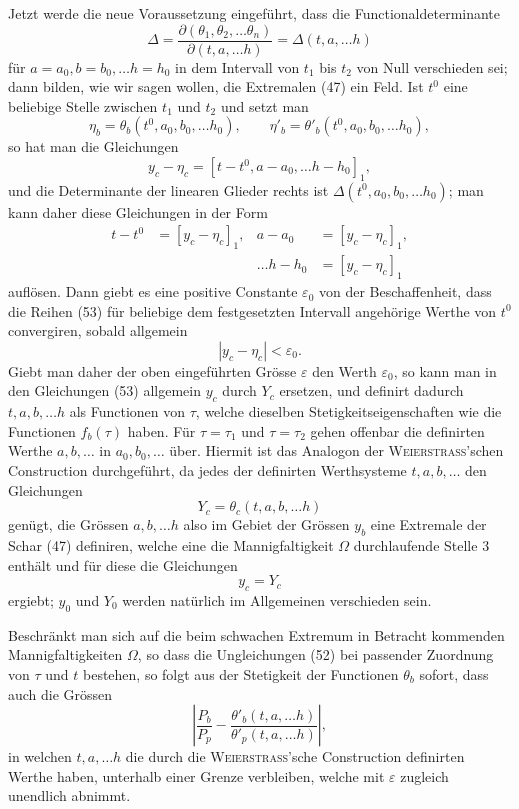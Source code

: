 \documentclass[11pt,a4paper,leqno]{article}
\begin{document}
Jetzt werde die neue Voraussetzung eingeführt, dass die Functionaldeterminante
\[
\Delta=
\frac{\partial(\theta_1,\theta_2,\ldots\theta_n)}
{\partial(t,a,\ldots h)}
=\Delta(t,a,\ldots h)
\]
für $a=a_0,b=b_0,\ldots h=h_0$ in dem Intervall von $t_1$ bis $t_2$ von Null verschieden sei; dann bilden, wie wir sagen wollen, die Extremalen (47) ein Feld. Ist $t^0$ eine beliebige Stelle zwischen $t_1$ und $t_2$ und setzt man
\[
\eta_b=\theta_b(t^0,a_0,b_0,\ldots h_0),
\qquad
\eta'_b=\theta'_b(t^0,a_0,b_0,\ldots h_0),
\]
so hat man die Gleichungen
\[
y_c-\eta_c=[t-t^0,a-a_0,\ldots h-h_0]_1,
\]
und die Determinante der linearen Glieder rechts ist $\Delta(t^0,a_0,b_0,\ldots h_0)$; man kann daher diese Gleichungen in der Form
\begin{equation}\tag{53}
\begin{aligned}
t-t^0&=[y_c-\eta_c]_1,
&a-a_0&=[y_c-\eta_c]_1,\\
&&\ldots h-h_0&=[y_c-\eta_c]_1
\end{aligned}
\end{equation}
auflösen. Dann giebt es eine positive Constante $\varepsilon_0$ von der Beschaffenheit, dass die Reihen (53) für beliebige dem festgesetzten Intervall angehörige Werthe von $t^0$ convergiren, sobald allgemein
\[
|y_c-\eta_c|<\varepsilon_0.
\]
Giebt man daher der oben eingeführten Grösse $\varepsilon$ den Werth $\varepsilon_0$, so kann man in den Gleichungen (53) allgemein $y_c$ durch $Y_c$ ersetzen, und definirt dadurch $t,a,b,\ldots h$ als Functionen von $\tau$, welche dieselben Stetigkeitseigenschaften wie die Functionen $f_b(\tau)$ haben. Für $\tau=\tau_1$ und $\tau=\tau_2$ gehen offenbar die definirten Werthe $a,b,\ldots$ in $a_0,b_0,\ldots$ über. Hiermit ist das Analogon der \textsc{Weierstrass}'schen Construction durchgeführt, da jedes der definirten Werthsysteme $t,a,b,\ldots$ den Gleichungen
\begin{equation}\tag{54}
Y_c=\theta_c(t,a,b,\ldots h)
\end{equation}
genügt, die Grössen $a,b,\ldots h$ also im Gebiet der Grössen $y_b$ eine Extremale der Schar (47) definiren, welche eine die Mannigfaltigkeit $\Omega$ durchlaufende Stelle 3 enthält und für diese die Gleichungen
\[
y_c=Y_c
\]
ergiebt; $y_0$ und $Y_0$ werden natürlich im Allgemeinen verschieden sein.

Beschränkt man sich auf die beim schwachen Extremum in Betracht kommenden Mannigfaltigkeiten $\Omega$, so dass die Ungleichungen (52) bei passender Zuordnung von $\tau$ und $t$ bestehen, so folgt aus der Stetigkeit der Functionen $\theta_b$ sofort, dass auch die Grössen
\begin{equation}\tag{55}
\left|
\frac{P_b}{P_p}
-\frac{\theta'_b(t,a,\ldots h)}{\theta'_p(t,a,\ldots h)}
\right|,
\end{equation}
in welchen $t,a,\ldots h$ die durch die \textsc{Weierstrass}'sche Construction definirten Werthe haben, unterhalb einer Grenze verbleiben, welche mit $\varepsilon$ zugleich unendlich abnimmt.
\end{document}
